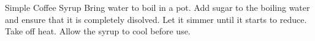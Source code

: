 \documentclass[../cookbook.tex]{subfiles}
\begin{document}
\begin{recipe}{Simple Coffee Syrup}{}{}
    Bring water to boil in a pot.
    Add sugar to the boiling water and ensure that it is completely disolved.
    Let it simmer until it starts to reduce. Take off heat. Allow the syrup to
    cool before use.
\end{recipe}
\end{document}
